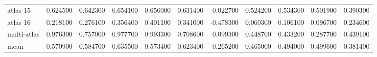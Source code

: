 \documentclass[a4paper]{article}
\begin{document}
\begin{landscape}
\begin{tabular}{lrrrrrrrrrr}
atlas 15 & 0.624500 & 0.642300 & 0.654100 & 0.656000 & 0.631400 & -0.022700 & 0.524200 & 0.534300 & 0.501900 & 0.390300 \\
atlas 16 & 0.218100 & 0.276100 & 0.356400 & 0.401100 & 0.341000 & -0.478300 & 0.060300 & 0.106100 & 0.096700 & 0.234600 \\
multi-atlas & 0.976300 & 0.757000 & 0.977700 & 0.993300 & 0.708600 & 0.099300 & 0.448700 & 0.433200 & 0.287700 & 0.439100 \\
mean & 0.570900 & 0.584700 & 0.635500 & 0.573400 & 0.623400 & 0.265200 & 0.465000 & 0.494000 & 0.499600 & 0.381400 \\
\bottomrule
\end{tabular}

\end{landscape}
\end{document}
